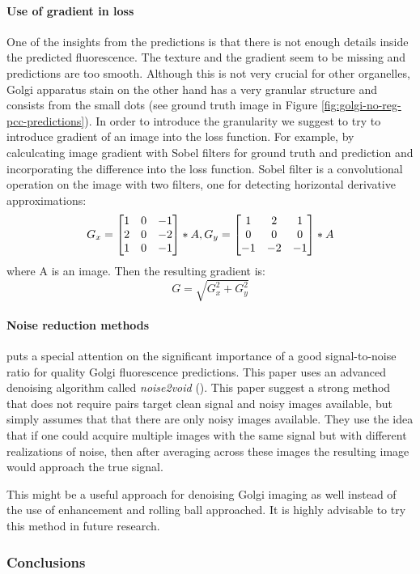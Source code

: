         \paragraph{Use of gradient in loss}
            One of the insights from the predictions is that there is not enough details inside the predicted fluorescence. The texture and the gradient seem to be missing and predictions are too smooth. Although this is not very crucial for other organelles, Golgi apparatus stain on the other hand has a very granular structure and consists from the small dots (see ground truth image in Figure \ref{fig:golgi-no-reg-pcc-predictions}). In order to introduce the granularity we suggest to try to introduce gradient of an image into the loss function. For example, by calculcating image gradient with Sobel filters for ground truth and prediction and incorporating the difference into the loss function. Sobel filter is a convolutional operation on the image with two filters, one for detecting horizontal derivative approximations:
            \begin{equation}
                G_x = \begin{bmatrix}
                    1 & 0 & -1\\
                    2 & 0 & -2\\
                    1 & 0 & -1
                    \end{bmatrix} * A, \smallskip
                G_y = \begin{bmatrix}
                    1 & 2 & 1\\
                    0 & 0 & 0\\
                    -1 & -2 & -1
                \end{bmatrix} * A
            \end{equation}
            where A is an image. Then the resulting gradient is:
            \begin{equation}
                G = \sqrt{G_x^2 + G_y^2}
            \end{equation}
        \paragraph{Noise reduction methods}
            \cite{Cheng_2021} puts a special attention on the significant importance of a good signal-to-noise ratio for quality Golgi fluorescence predictions. This paper uses an advanced denoising algorithm called \textit{noise2void} (\cite{noise2void}). This paper suggest a strong method that does not require pairs target clean signal and noisy images available, but simply assumes that that there are only noisy images available. They use the idea that if one could acquire multiple images with the same signal but with different realizations of noise, then after averaging across these images the resulting image would approach the true signal. 

            This might be a useful approach for denoising Golgi imaging as well instead of the use of enhancement and rolling ball approached. It is highly advisable to try this method in future research.

    \subsubsection{Conclusions}
        